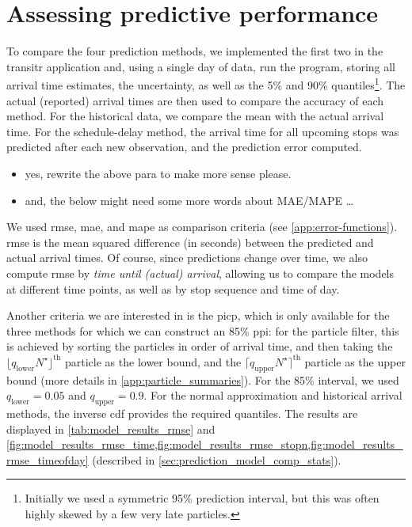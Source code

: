 \section{Assessing predictive performance}
\label{sec:prediction_model_comparison}


To compare the four prediction methods, we implemented the first two in the \textsf{transitr} application and, using a single day of data, run the program, storing all arrival time estimates, the uncertainty, as well as the 5\% and 90\% quantiles\footnote{Initially we used a symmetric 95\% prediction interval, but this was often highly skewed by a few very late particles.}. The actual (reported) arrival times are then used to compare the accuracy of each method. For the historical data, we compare the mean with the actual arrival time. For the schedule-delay method, the arrival time for all upcoming stops was predicted after each new observation, and the prediction error computed.

\begin{itemize}
\item yes, rewrite the above para to make more sense please.
\item and, the below might need some more words about MAE/MAPE \ldots
\end{itemize}

We used \gls{rmse}, \gls{mae}, and \gls{mape} as comparison criteria (see \cref{app:error-functions}).
\Gls{rmse} is the mean squared difference (in seconds) between the predicted and actual arrival times. Of course, since predictions change over time, we also compute \gls{rmse} by \emph{time until (actual) arrival}, allowing us to compare the models at different time points, as well as by stop sequence and time of day.


Another criteria we are interested in is the \gls{picp}, which is only available for the three methods for which we can construct an 85\% \gls{ppi}: for the particle filter, this is achieved by sorting the particles in order of arrival time, and then taking the $\lfloor q_\text{lower} N^\star\rfloor^{\text{th}}$ particle as the lower bound, and the $\lceil q_{\text{upper}} N^\star\rceil^{\text{th}}$ particle as the upper bound (more details in \cref{app:particle_summaries}). For the 85\% interval, we used $q_\text{lower} = 0.05$ and $q_\text{upper} = 0.9$. For the normal approximation and historical arrival methods, the inverse \gls{cdf} provides the required quantiles. The results are displayed in \cref{tab:model_results_rmse} and \cref{fig:model_results_rmse_time,fig:model_results_rmse_stopn,fig:model_results_rmse_timeofday} (described in \cref{sec:prediction_model_comp_stats}).


